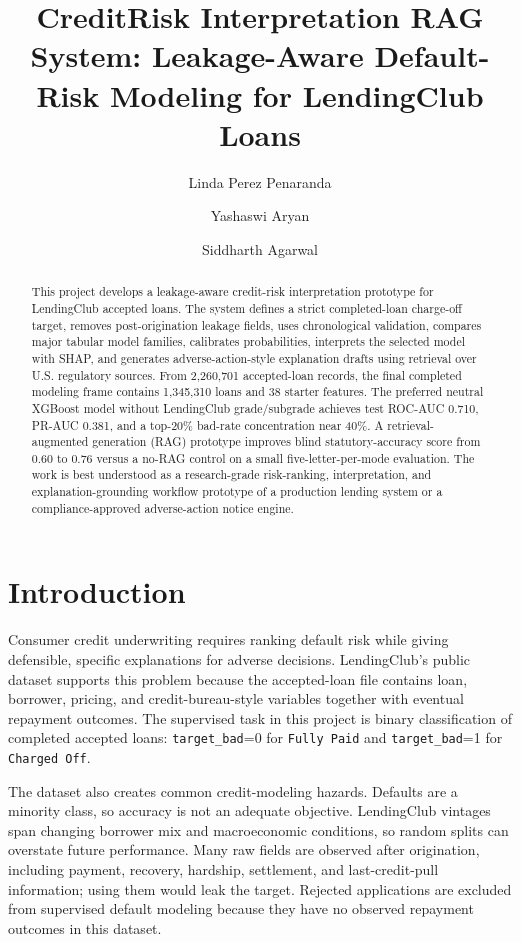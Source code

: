 \documentclass[11pt]{article}
\title{CreditRisk Interpretation RAG System: Leakage-Aware Default-Risk Modeling for LendingClub Loans}
\author{Linda Perez Penaranda \and Yashaswi Aryan \and Siddharth Agarwal}
\date{}
\begin{document}
\sloppy
\maketitle

\begin{abstract}
This project develops a leakage-aware credit-risk interpretation prototype for LendingClub accepted loans. The system defines a strict completed-loan charge-off target, removes post-origination leakage fields, uses chronological validation, compares major tabular model families, calibrates probabilities, interprets the selected model with SHAP, and generates adverse-action-style explanation drafts using retrieval over U.S. regulatory sources. From 2,260,701 accepted-loan records, the final completed modeling frame contains 1,345,310 loans and 38 starter features. The preferred neutral XGBoost model without LendingClub grade/subgrade achieves test ROC-AUC 0.710, PR-AUC 0.381, and a top-20\% bad-rate concentration near 40\%. A retrieval-augmented generation (RAG) prototype improves blind statutory-accuracy score from 0.60 to 0.76 versus a no-RAG control on a small five-letter-per-mode evaluation. The work is best understood as a research-grade risk-ranking, interpretation, and explanation-grounding workflow prototype of a  production lending system or a compliance-approved adverse-action notice engine.
\end{abstract}

\section{Introduction}
Consumer credit underwriting requires ranking default risk while giving defensible, specific explanations for adverse decisions. LendingClub's public dataset supports this problem because the accepted-loan file contains loan, borrower, pricing, and credit-bureau-style variables together with eventual repayment outcomes. The supervised task in this project is binary classification of completed accepted loans: \texttt{target\_bad}=0 for \texttt{Fully Paid} and \texttt{target\_bad}=1 for \texttt{Charged Off}.

The dataset also creates common credit-modeling hazards. Defaults are a minority class, so accuracy is not an adequate objective. LendingClub vintages span changing borrower mix and macroeconomic conditions, so random splits can overstate future performance. Many raw fields are observed after origination, including payment, recovery, hardship, settlement, and last-credit-pull information; using them would leak the target. Rejected applications are excluded from supervised default modeling because they have no observed repayment outcomes in this dataset.
\end{document}
